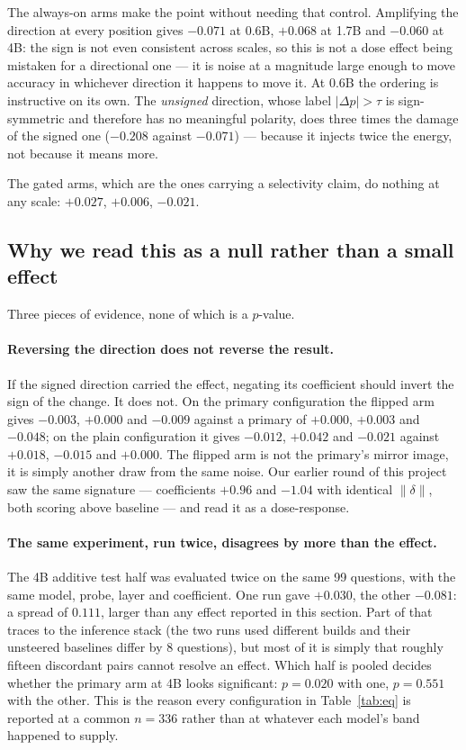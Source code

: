 \documentclass{article}
\newcommand{\pdelta}{\Delta p}
\begin{document}
The always-on arms make the point without needing that control. Amplifying
the direction at every position gives $-0.071$ at 0.6B, $\mathbf{+0.068}$
at 1.7B and $-0.060$ at 4B: the sign is not even consistent across scales,
so this is not a dose effect being mistaken for a directional one --- it is
noise at a magnitude large enough to move accuracy in whichever direction
it happens to move it. At 0.6B the ordering is instructive on its own. The
\emph{unsigned} direction, whose label $|\pdelta| > \tau$ is sign-symmetric
and therefore has no meaningful polarity, does three times the damage of
the signed one ($-0.208$ against $-0.071$) --- because it injects twice the
energy, not because it means more.

The gated arms, which are the ones carrying a selectivity claim, do
nothing at any scale: $+0.027$, $+0.006$, $-0.021$.

\subsection{Why we read this as a null rather than a small effect}
\label{sec:nullreading}

Three pieces of evidence, none of which is a $p$-value.

\paragraph{Reversing the direction does not reverse the result.} If the
signed direction carried the effect, negating its coefficient should
invert the sign of the change. It does not. On the primary configuration
the flipped arm gives $-0.003$, $+0.000$ and $-0.009$ against a primary of
$+0.000$, $+0.003$ and $-0.048$; on the plain configuration it gives
$-0.012$, $+0.042$ and $-0.021$ against $+0.018$, $-0.015$ and $+0.000$.
The flipped arm is not the primary's mirror image, it is simply another
draw from the same noise. Our earlier round of this project saw the same
signature --- coefficients $+0.96$ and $-1.04$ with identical
$\|\delta\|$, both scoring above baseline --- and read it as a
dose-response.

\paragraph{The same experiment, run twice, disagrees by more than the
effect.} The 4B additive test half was evaluated twice on the same 99
questions, with the same model, probe, layer and coefficient. One run gave
$+0.030$, the other $-0.081$: a spread of $0.111$, larger than any effect
reported in this section. Part of that traces to the inference stack (the
two runs used different builds and their unsteered baselines differ by 8
questions), but most of it is simply that roughly fifteen discordant pairs
cannot resolve an effect. Which half is pooled decides whether the primary
arm at 4B looks significant: $p{=}0.020$ with one, $p{=}0.551$ with the
other. This is the reason every configuration in Table~\ref{tab:eq} is
reported at a common $n{=}336$ rather than at whatever each model's band
happened to supply.
\end{document}
